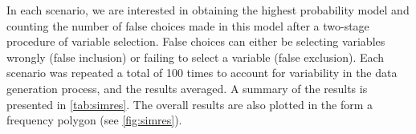 \documentclass[11pt,twoside,openright]{report}
\begin{document}
In each scenario, we are interested in obtaining the highest probability model and counting the number of false choices made in this model after a two-stage procedure of variable selection.
False choices can either be selecting variables wrongly (false inclusion) or failing to select a variable (false exclusion).
Each scenario was repeated a total of 100 times to account for variability in the data generation process, and the results averaged. 
A summary of the results is presented in \cref{tab:simres}.
The overall results are also plotted in the form a frequency polygon (see \cref{fig:simres}).

\end{document}
